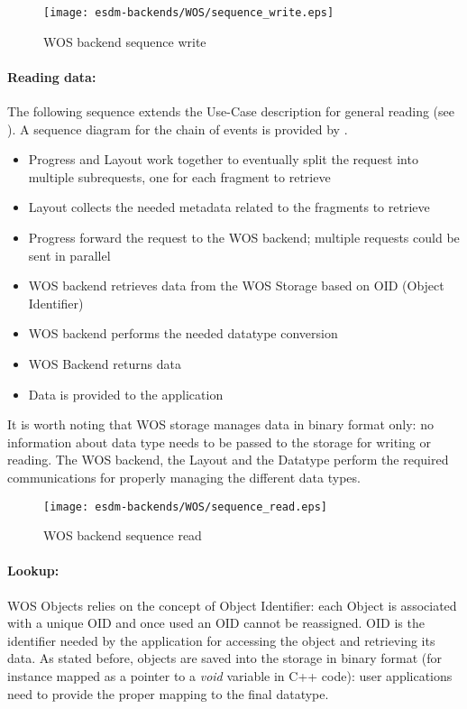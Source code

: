 \begin{figure}
	\centering
	\texttt{[image: esdm-backends/WOS/sequence\_write.eps]}
	\caption{WOS backend sequence write}
	\label{fig:WOS backend sequence write}
\end{figure}

\paragraph{Reading data:}
The following sequence extends the Use-Case description for general reading (see ).
A sequence diagram for the chain of events is provided by .

\begin{itemize}
	\item Progress and Layout work together to eventually split the request into multiple subrequests, one for each fragment to retrieve
	\item Layout collects the needed metadata related to the fragments to retrieve
	\item Progress forward the request to the WOS backend; multiple requests could be sent in parallel
	\item WOS backend retrieves data from the WOS Storage based on OID (Object Identifier)
	\item WOS backend performs the needed datatype conversion
	\item WOS Backend returns data
	\item Data is provided to the application
\end{itemize}

It is worth noting that WOS storage manages data in binary format only: no information about data type needs to be passed to the storage for writing or reading. The WOS backend, the Layout and the Datatype perform the required communications for properly managing the different data types.

\begin{figure}
	\centering
	\texttt{[image: esdm-backends/WOS/sequence\_read.eps]}
	\caption{WOS backend sequence read}
	\label{fig:WOS backend sequence read}
\end{figure}

\paragraph{Lookup:}
WOS Objects relies on the concept of Object Identifier: each Object is associated with a unique OID and once used an OID cannot be reassigned. OID is the identifier needed by the application for accessing the object and retrieving its data. As stated before, objects are saved into the storage in binary format (for instance mapped as a pointer to a \textit{void} variable in C++ code): user applications need to provide the proper mapping to the final datatype.

